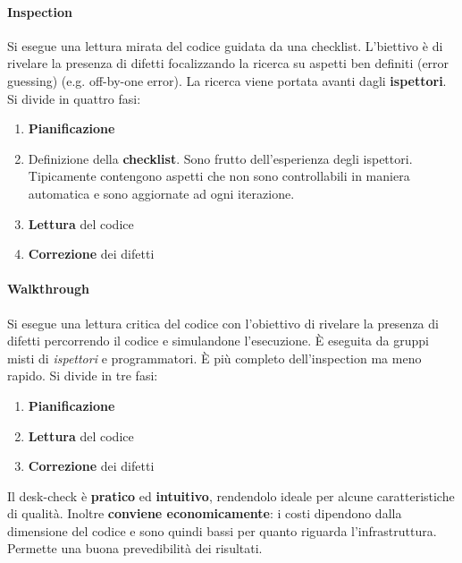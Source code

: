 \paragraph{Inspection} Si esegue una lettura mirata del codice guidata da una checklist. L'biettivo è di rivelare la presenza di difetti focalizzando la ricerca su aspetti ben definiti (error guessing) (e.g. off-by-one error). La ricerca viene portata avanti dagli \textbf{ispettori}. Si divide in quattro fasi:
\begin{enumerate}
	\item \textbf{Pianificazione}
	\item Definizione della \textbf{checklist}. Sono frutto dell'esperienza degli ispettori. Tipicamente contengono aspetti che non sono controllabili in maniera automatica e sono aggiornate ad ogni iterazione.
	\item \textbf{Lettura} del codice
	\item \textbf{Correzione} dei difetti
\end{enumerate}

\paragraph{Walkthrough} Si esegue una lettura critica del codice con l'obiettivo di rivelare la presenza di difetti percorrendo il codice e simulandone l'esecuzione. È eseguita da gruppi misti di \textit{ispettori} e programmatori. È più completo dell'inspection ma meno rapido. Si divide in tre fasi:
\begin{enumerate}
	\item \textbf{Pianificazione}
	\item \textbf{Lettura} del codice
	\item \textbf{Correzione} dei difetti
\end{enumerate}

Il desk-check è \textbf{pratico} ed \textbf{intuitivo}, rendendolo ideale per alcune caratteristiche di qualità. Inoltre \textbf{conviene economicamente}: i costi dipendono dalla dimensione del codice e sono quindi bassi per quanto riguarda l'infrastruttura. Permette una buona prevedibilità dei risultati.

